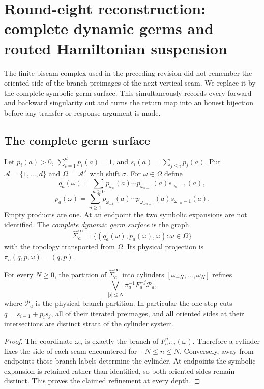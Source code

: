 \section{Round-eight reconstruction: complete dynamic germs and routed Hamiltonian suspension}
\label{sec:r8-a1}

The finite biseam complex used in the preceding revision did not remember the
oriented side of the branch preimages of the next vertical seam.  We replace it
by the complete symbolic germ surface.  This simultaneously records every
forward and backward singularity cut and turns the return map into an honest
bijection before any transfer or response argument is made.

\subsection{The complete germ surface}

Let $p_i(a)>0$, $\sum_{i=1}^dp_i(a)=1$, and
$s_i(a)=\sum_{j\le i}p_j(a)$.  Put $\mathcal A=\{1,\ldots,d\}$ and
$\Omega=\mathcal A^{\mathbb Z}$ with shift $\sigma$.  For
$\omega\in\Omega$ define
\[
 q_a(\omega)=\sum_{n\ge0}p_{\omega_0}(a)\cdots p_{\omega_{n-1}}(a)
 s_{\omega_n-1}(a),
\]
\[
 p_a(\omega)=\sum_{n\ge1}p_{\omega_{-1}}(a)\cdots p_{\omega_{-n+1}}(a)
 s_{\omega_{-n}-1}(a).
\]
Empty products are one.  At an endpoint the two symbolic expansions are not
identified.  The \emph{complete dynamic germ surface} is the graph
\[
 \widehat\Sigma_a^\infty
 =\{(q_a(\omega),p_a(\omega),\omega):\omega\in\Omega\}
\]
with the topology transported from $\Omega$.  Its physical projection is
$\pi_a(q,p,\omega)=(q,p)$.

\begin{lemma}
\label{lem:r8-a1-all-seams}
For every $N\ge0$, the partition of $\widehat\Sigma_a^\infty$ into cylinders
$[\omega_{-N},\ldots,\omega_N]$ refines
\[
 \bigvee_{|j|\le N}\pi_a^{-1}F_a^{-j}\mathcal P_a,
\]
where $\mathcal P_a$ is the physical branch partition.  In particular the
one-step cuts $q=s_{i-1}+p_i s_j$, all of their iterated preimages, and all
oriented sides at their intersections are distinct strata of the cylinder
system.
\end{lemma}

\begin{proof}
The coordinate $\omega_n$ is exactly the branch of $F_a^n\pi_a(\omega)$.
Therefore a cylinder fixes the side of each seam encountered for
$-N\le n\le N$.  Conversely, away from endpoints those branch labels determine
the cylinder.  At endpoints the symbolic expansion is retained rather than
identified, so both oriented sides remain distinct.  This proves the claimed
refinement at every depth.
\end{proof}

